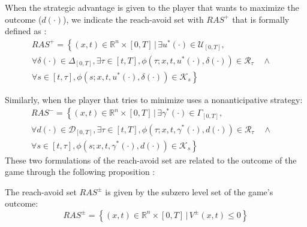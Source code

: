 When the strategic advantage is given to the player that wants to maximize the outcome ($d(\cdot)$), we indicate the reach-avoid set with $RAS^+$ that is formally defined as \cite{new_paper}:
\begin{multline}
    \label{ras_p}
    RAS^+ = 
    \left\{
        (x,t) \in \mathbb{R}^n \times [0,T] \,|\, \exists u^*(\cdot) \in \mathcal{U}_{[0, T]},
    \right.\\
    \left.
          \forall \delta(\cdot) \in \Delta_{[0, T]}, \exists \tau \in [t, T], \phi(\tau; x, t, u^*(\cdot), \delta(\cdot)) \in \mathcal{R}_\tau \quad \wedge \quad       
    \right.\\
    \left.
        \forall s \in [t, \tau], \phi(s; x, t, u^*(\cdot), \delta(\cdot)) \in \mathcal{K}_s
    \right\}
\end{multline}

Similarly, when the player that tries to minimize uses a nonanticipative strategy:
\begin{multline}
    \label{ras_m}
    RAS^- = 
    \left\{
        (x,t) \in \mathbb{R}^n \times [0,T] \,|\, \exists \gamma^*(\cdot) \in \Gamma_{[0, T]},
    \right.\\
    \left.
          \forall d(\cdot) \in \mathcal{D}_{[0, T]}, \exists \tau \in [t, T], \phi(\tau; x, t, \gamma^*(\cdot), d(\cdot)) \in \mathcal{R}_\tau \quad \wedge \quad       
    \right.\\
    \left.
        \forall s \in [t, \tau], \phi(s; x, t, \gamma^*(\cdot), d(\cdot)) \in \mathcal{K}_s
    \right\}
\end{multline}
These two formulations of the reach-avoid set are related to the outcome of the game through the following proposition \cite{new_paper}:
\begin{prop}
    \label{ras_p_m_v}
    The reach-avoid set $RAS^\pm$ is given by the subzero level set of the game's outcome: 
    \[
        RAS^\pm=
        \left\{
            (x, t) \in \mathbb{R}^n \times [0, T] \,|\, V^\pm(x,t) \leq 0
        \right\}
    \]
\end{prop}


